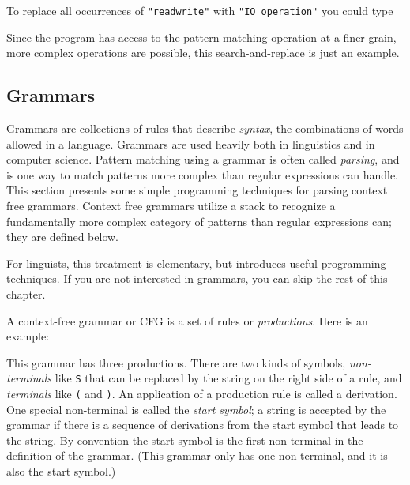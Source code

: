 To replace all occurrences of
\texttt{"read{\textbar}write"} with
\texttt{"IO operation"} you could type


Since the program has access to the pattern matching operation at a
finer grain, more complex operations are possible, this
search-and-replace is just an example.

\subsection{Grammars}

Grammars are collections of rules that describe
\textit{syntax}, the combinations of words allowed in a
language. Grammars are used heavily both in linguistics and in computer
science. Pattern matching using a grammar is
often called \textit{parsing}, and is one way to match
patterns more complex than regular expressions can handle. This section
presents some simple programming techniques for parsing context free
grammars. Context free grammars utilize a stack to
recognize a fundamentally more complex category of patterns than
regular expressions can; they are defined below.

For linguists, this treatment is elementary, but introduces useful
programming techniques.
If you are not interested in grammars, you
can skip the rest of this chapter.

A context-free grammar or CFG is a set of
rules or \textit{productions}. Here is an example:


This grammar has three productions. There are two kinds of symbols,
\textit{non-terminals} like \texttt{S} that can be replaced by the
string on the right side of a rule, and \textit{terminals} like
\texttt{(} and \texttt{)}. An application of a production rule is called
a derivation. One special non-terminal is called the
\textit{start symbol}; a string is accepted by the grammar if there is a
sequence of derivations from the start symbol that leads to the string.
By convention the start symbol is the first non-terminal in the
definition of the grammar. (This grammar only has one non-terminal, and
it is also the start symbol.)

